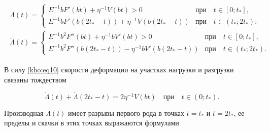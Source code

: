 \begin{gather}

\label{kho:eq10}

\begin{array}{l}

\dot{\Lambda}(t)=

\begin{cases}

E^{-1}bF'(bt)+\eta^{-1}V(bt)>0 & \text{при~~ } t\in[0;t_\ast], \\

E^{-1}bF'(b(2t_\ast-t))+\eta^{-1}V(b(2t_\ast-t)) & \text{при~~ } t\in(t_\ast;2t_\ast);

\end{cases}

\\[6mm]

\ddot{\Lambda}(t)= \begin{cases}

E^{-1}b^2F''(bt)+\eta^{-1}bV'(bt)>0 &\text{при~~ } t\in[0;t_\ast], \\

E^{-1}b^2F''(b(2t_\ast-t))-\eta^{-1}bV'(b(2t_\ast-t)) & \text{при~~ } t\in(t_\ast;2t_\ast).

\end{cases}

\end{array}

\end{gather}



В силу \eqref{kho:eq10} скорости деформации на участках нагрузки и разгрузки связаны тождеством

\begin{equation}

\label{kho:eq12}

\dot{\Lambda}(t)+\dot{\Lambda}(2t_\ast-t)=2\eta^{-1}V(bt) \text{ ~~при~~ } t\in(0;t_\ast).

\end{equation}



Производная $\dot{\Lambda}(t)$ имеет разрывы первого рода в точках $t=t_\ast$ и $t=2t_\ast$, ее пределы и скачки в этих точках выражаются формулами 

